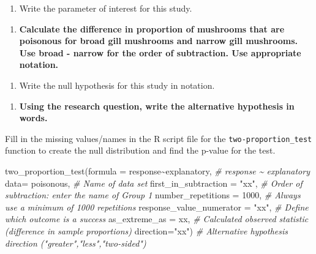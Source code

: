 \documentclass[
]{report}
\newenvironment{Shaded}{\begin{snugshade}}{\end{snugshade}}
\newcommand{\AttributeTok}[1]{\textcolor[rgb]{0.77,0.63,0.00}{#1}}
\newcommand{\CommentTok}[1]{\textcolor[rgb]{0.56,0.35,0.01}{\textit{#1}}}
\newcommand{\DecValTok}[1]{\textcolor[rgb]{0.00,0.00,0.81}{#1}}
\newcommand{\FunctionTok}[1]{\textcolor[rgb]{0.00,0.00,0.00}{#1}}
\newcommand{\NormalTok}[1]{#1}
\newcommand{\SpecialCharTok}[1]{\textcolor[rgb]{0.00,0.00,0.00}{#1}}
\newcommand{\StringTok}[1]{\textcolor[rgb]{0.31,0.60,0.02}{#1}}
\providecommand{\tightlist}{%
  \setlength{\itemsep}{0pt}\setlength{\parskip}{0pt}}
\begin{document}
\begin{enumerate}
\def\labelenumi{\arabic{enumi}.}
\setcounter{enumi}{3}
\tightlist
\item
  Write the parameter of interest for this study.
\end{enumerate}

\vspace{1in}

\begin{enumerate}
\def\labelenumi{\arabic{enumi}.}
\setcounter{enumi}{4}
\tightlist
\item
  \textbf{Calculate the difference in proportion of mushrooms that are poisonous for broad gill mushrooms and narrow gill mushrooms. Use broad - narrow for the order of subtraction. Use appropriate notation.}
\end{enumerate}

\vspace{0.8in}

\vspace{1in}

\begin{enumerate}
\def\labelenumi{\arabic{enumi}.}
\setcounter{enumi}{5}
\tightlist
\item
  Write the null hypothesis for this study in notation.
\end{enumerate}

\vspace{0.25in}

\begin{enumerate}
\def\labelenumi{\arabic{enumi}.}
\setcounter{enumi}{6}
\tightlist
\item
  \textbf{Using the research question, write the alternative hypothesis in words.}
\end{enumerate}

\vspace{1in}
\newpage

Fill in the missing values/names in the R script file for the \texttt{two-proportion\_test} function to create the null distribution and find the p-value for the test.

\begin{Shaded}
\begin{Highlighting}[]
\FunctionTok{two\_proportion\_test}\NormalTok{(}\AttributeTok{formula =}\NormalTok{ response}\SpecialCharTok{\textasciitilde{}}\NormalTok{explanatory, }\CommentTok{\# response \textasciitilde{} explanatory}
    \AttributeTok{data=}\NormalTok{ poisonous, }\CommentTok{\# Name of data set}
    \AttributeTok{first\_in\_subtraction =} \StringTok{"xx"}\NormalTok{, }\CommentTok{\# Order of subtraction: enter the name of Group 1}
    \AttributeTok{number\_repetitions =} \DecValTok{1000}\NormalTok{, }\CommentTok{\# Always use a minimum of 1000 repetitions}
    \AttributeTok{response\_value\_numerator =} \StringTok{"xx"}\NormalTok{, }\CommentTok{\# Define which outcome is a success }
    \AttributeTok{as\_extreme\_as =}\NormalTok{ xx, }\CommentTok{\# Calculated observed statistic (difference in sample proportions)}
    \AttributeTok{direction=}\StringTok{"xx"}\NormalTok{) }\CommentTok{\# Alternative hypothesis direction ("greater","less","two{-}sided")}
\end{Highlighting}
\end{Shaded}
\end{document}
